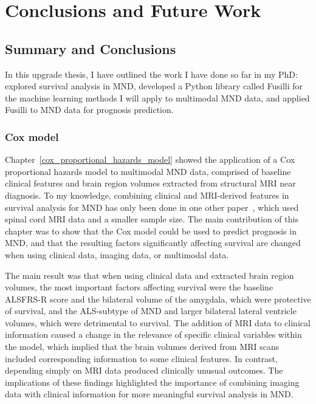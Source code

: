\chapter{Conclusions and Future Work}
\label{conclusions_and_future_work}

\section{Summary and Conclusions}

In this upgrade thesis, I have outlined the work I have done so far in my PhD: explored survival analysis in MND, developed a Python library called Fusilli for the machine learning methods I will apply to multimodal MND data, and applied Fusilli to MND data for prognosis prediction.

\subsection{Cox model}

Chapter~\ref{cox_proportional_hazards_model} showed the application of a Cox proportional hazards model to multimodal MND data, comprised of baseline clinical features and brain region volumes extracted from structural MRI near diagnosis.
To my knowledge, combining clinical and MRI-derived features in survival analysis for MND has only been done in one other paper~\cite{querinSpinalCordMultiparametric2017}, which used spinal cord MRI data and a smaller sample size.
The main contribution of this chapter was to show that the Cox model could be used to predict prognosis in MND, and that the resulting factors significantly affecting survival are changed when using clinical data, imaging data, or multimodal data.

The main result was that when using clinical data and extracted brain region volumes, the most important factors affecting survival were the baseline ALSFRS-R score and the bilateral volume of the amygdala, which were protective of survival, and the ALS-subtype of MND and larger bilateral lateral ventricle volumes, which were detrimental to survival.
The addition of MRI data to clinical information caused a change in the relevance of specific clinical variables within the model, which implied that the brain volumes derived from MRI scans included corresponding information to some clinical features.
In contrast, depending simply on MRI data produced clinically unusual outcomes.
The implications of these findings highlighted the importance of combining imaging data with clinical information for more meaningful survival analysis in MND.

